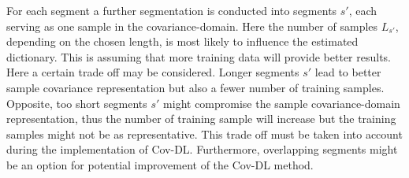 For each segment a further segmentation is conducted into segments $s'$, each serving as one sample in the covariance-domain. Here the number of samples $L_{s'}$, depending on the chosen length, is most likely to influence the estimated dictionary. This is assuming that more training data will provide better results. Here a certain trade off may be considered. Longer segments $s'$ lead to better sample covariance representation but also a fewer number of training samples. Opposite, too short segments $s'$ might compromise the sample covariance-domain representation, thus the number of training sample will increase but the training samples might not be as representative.                 
This trade off must be taken into account during the implementation of Cov-DL.  
Furthermore, overlapping segments might be an option for potential improvement of the Cov-DL method.